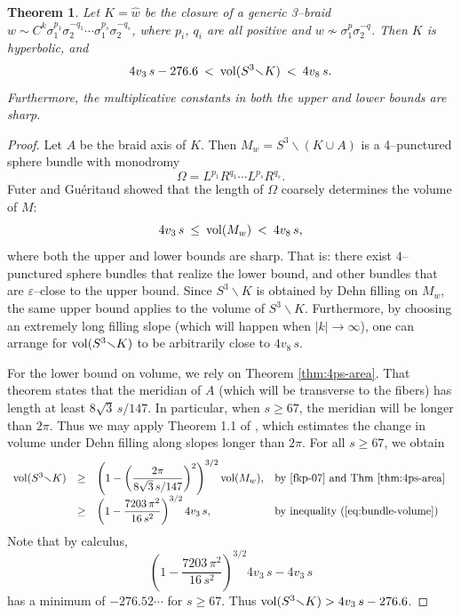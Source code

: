 \documentclass[11pt]{amsart}
\renewcommand{\setminus}{{\smallsetminus}}
\newcommand{\vol}{{\rm vol}}
\newcommand{\abs}[1]{{\left\vert #1 \right\vert}}
\theoremstyle{plain}
\newtheorem{theorem}{Theorem}[section]
\theoremstyle{definition}
\begin{document}
\begin{theorem}\label{thm:3braid-volume}
Let $K= \hat{w}$ be the closure of a generic 3--braid $w \sim C^k
\sigma_1^{p_1} \sigma_2^{-q_1} \cdots \sigma_1^{p_s} \sigma_2^{-q_s}$,
where $p_i$, $q_i$ are all positive and $w \nsim
\sigma_1^p\sigma_2^{-q}$.  Then $K$ is hyperbolic, and
\begin{equation}\label{eq:3braid-volume}
4v_3 \, s - 276.6 \: < \: \vol(S^3 \setminus K) \: < \: 4v_8 \, s.
\end{equation}
Furthermore, the multiplicative constants in both the upper and lower
bounds are sharp.
\end{theorem}

\begin{proof}
Let $A$ be the braid axis of $K$. Then $M_w = S^3 \setminus (K \cup
A)$ is a 4--punctured sphere bundle with monodromy
$$\Omega = L^{p_1} R^{q_1} \cdots L^{p_s} R^{q_s}.$$
%
Futer and Gu\'eritaud showed \cite[Corollary B.2]{gf:two-bridge} that
the length of $\Omega$ coarsely determines the volume of $M$:
\begin{equation}\label{eq:bundle-volume}
4 v_3 \, s \: \leq \: \vol(M_w) \: < \: 4v_8 \, s,
\end{equation}
where both the upper and lower bounds are sharp.  That is: there exist
$4$--punctured sphere bundles that realize the lower bound, and other
bundles that are $\varepsilon$--close to the upper bound.  Since $S^3
\setminus K$ is obtained by Dehn filling on $M_w$, the same upper
bound applies to the volume of $S^3 \setminus K$.  Furthermore, by
choosing an extremely long filling slope (which will happen when
$\abs{k} \to \infty$), one can arrange for $\vol(S^3 \setminus K)$ to
be arbitrarily close to $4 v_8 \, s$.

For the lower bound on volume, we rely on Theorem \ref{thm:4ps-area}.
That theorem states that the meridian of $A$ (which will be transverse
to the fibers) has length at least $8\sqrt{3} \, s/147$.  In
particular, when $s \geq 67$, the meridian will be longer than $2\pi$.
Thus we may apply Theorem 1.1 of \cite{fkp-07}, which estimates the
change in volume under Dehn filling along slopes longer than $2\pi$.
For all $s \geq 67$, we obtain
$$
\begin{array}{l l l l l}
\vol(S^3 \setminus K) 
&\geq&  \left(1-\left(\dfrac{2\pi}{8\sqrt{3} \, s/147}\right)^2\right)^{3/2} \vol(M_w), 
& \mbox{by \cite[Thm 1.1]{fkp-07} and Thm \ref{thm:4ps-area} }\\
&\geq&  \left(1-\dfrac{7203  \, \pi^2 }{16 \, s^2} \right)^{3/2} 4 v_3 \, s,
& \mbox{by inequality (\ref{eq:bundle-volume})}
\end{array}
$$
Note that by calculus,
$$\left(1-\dfrac{7203 \, \pi^2}{16\,s^2}\right)^{3/2} 4 v_3 \, s -
4v_3\,s$$
has a minimum of $-276.52\cdots$ for $s\geq 67$.  Thus $\vol(S^3
\setminus K) > 4v_3\,s - 276.6$.


\end{proof}
\end{document}
